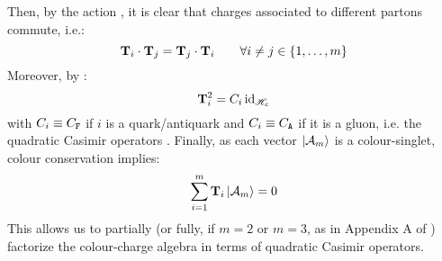Then, by the action , it is clear that charges associated to different partons commute, i.e.:
\begin{equation}
  \mathbf{T}_i \cdot \mathbf{T}_j = \mathbf{T}_j \cdot \mathbf{T}_i
  \qquad
  \forall i \neq j \in \{1, \dots, m\}
\end{equation}
Moreover, by :
\begin{equation}
  \mathbf{T}_i^2 = C_i \operatorname{id}_{\mathscr{H}_c}
\end{equation}
with $ C_i \equiv C_\mathtt{F} $ if $ i $ is a quark/antiquark and $ C_i \equiv C_\mathtt{A} $ if it is a gluon, i.e. the quadratic Casimir operators . Finally, as each vector $ \ket{\mathcal{A}_m} $ is a colour-singlet, colour conservation implies:
\begin{equation}
  \sum_{i = 1}^{m} \mathbf{T}_i \ket{\mathcal{A}_m} = 0
\end{equation}
This allows us to partially (or fully, if $ m = 2 $ or $ m = 3 $, as in Appendix A of \cite{Catani-1997}) factorize the colour-charge algebra in terms of quadratic Casimir operators.










